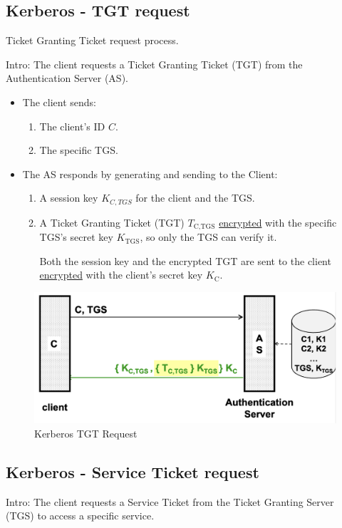 \subsection*{Kerberos - TGT request}
\begin{center}
    Ticket Granting Ticket request process.
\end{center}
Intro:
The client requests a Ticket Granting Ticket (TGT) from the Authentication Server (AS).
\begin{itemize}
    \item The client sends:
    \begin{enumerate}
        \item The client's ID $C$.
        \item The specific TGS.
    \end{enumerate} 
    \item The AS responds by generating and sending to the Client:
    \begin{enumerate}
        \item A session key $K_{C,TGS}$ for the client and the TGS.
        \item A Ticket Granting Ticket (TGT)  $T_{\text{C,TGS}}$ \underline{encrypted} with the specific TGS's secret key $K_{\text{TGS}}$, so only the TGS can verify it.
        
        \begin{center}
            Both the session key and the encrypted TGT are sent to the client \underline{encrypted} with the client's secret key $K_{\text{C}}$.
        \end{center}
    \end{enumerate}
\end{itemize}
\begin{figure}[H]
    \centering
    \includegraphics[width=0.5\linewidth]{Images/Authentication/kerreq.png}
    \caption{Kerberos TGT Request}
\end{figure}

\subsection*{Kerberos - Service Ticket request}
Intro: The client requests a Service Ticket from the Ticket Granting Server (TGS) to access a specific service.

